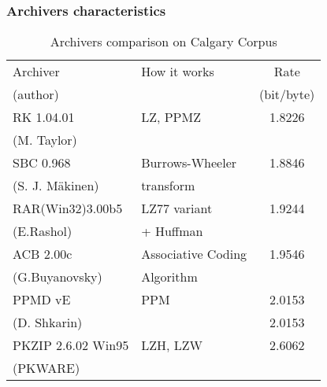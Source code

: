 \documentclass[14pt]{beamer}
\begin{document}
\begin{frame}
\frametitle{Archivers characteristics}
\begin{itemize}    


    \begin{table}[htbp]
    \begin{center}
    \caption{Archivers comparison on Calgary Corpus}
    \scalebox{0.6} {
    \begin{tabular}
    {|l|l|c|}
    \hline %
    Archiver & How it works & Rate \\
    (author)   &               & (bit/byte) \\ \hline %
    RK 1.04.01 & LZ, PPMZ & 1.8226 \\
    (M. Taylor)&    &         \\   \hline %
    SBC 0.968  & Burrows-Wheeler &  1.8846 \\
    (S. J. M\"{a}kinen)& transform & \\ \hline %
    RAR(Win32)3.00b5 & LZ77 variant &1.9244 \\
    (E.Rashol)       &  + Huffman &  \\   \hline %
    ACB 2.00c & Associative Coding &1.9546 \\
    (G.Buyanovsky)& Algorithm& \\  \hline %
    PPMD vE & PPM& 2.0153 \\   %
    (D. Shkarin) &     & 2.0153 \\ \hline %
    PKZIP 2.6.02 Win95& LZH, LZW&
    2.6062 \\
    (PKWARE)& &   \\\hline %
    \end{tabular}
    }
    \label{tab4_11}
    \end{center}
    \end{table}


\end{itemize}
\end{frame}



\end{document}
